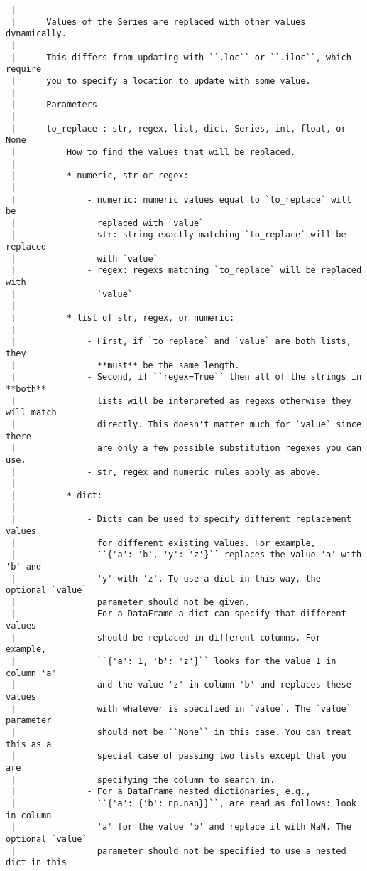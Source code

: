 \documentclass[
  letterpaper,
  DIV=11,
  numbers=noendperiod]{scrreprt}
\begin{document}
\begin{verbatim}
 |      
 |      Values of the Series are replaced with other values dynamically.
 |      
 |      This differs from updating with ``.loc`` or ``.iloc``, which require
 |      you to specify a location to update with some value.
 |      
 |      Parameters
 |      ----------
 |      to_replace : str, regex, list, dict, Series, int, float, or None
 |          How to find the values that will be replaced.
 |      
 |          * numeric, str or regex:
 |      
 |              - numeric: numeric values equal to `to_replace` will be
 |                replaced with `value`
 |              - str: string exactly matching `to_replace` will be replaced
 |                with `value`
 |              - regex: regexs matching `to_replace` will be replaced with
 |                `value`
 |      
 |          * list of str, regex, or numeric:
 |      
 |              - First, if `to_replace` and `value` are both lists, they
 |                **must** be the same length.
 |              - Second, if ``regex=True`` then all of the strings in **both**
 |                lists will be interpreted as regexs otherwise they will match
 |                directly. This doesn't matter much for `value` since there
 |                are only a few possible substitution regexes you can use.
 |              - str, regex and numeric rules apply as above.
 |      
 |          * dict:
 |      
 |              - Dicts can be used to specify different replacement values
 |                for different existing values. For example,
 |                ``{'a': 'b', 'y': 'z'}`` replaces the value 'a' with 'b' and
 |                'y' with 'z'. To use a dict in this way, the optional `value`
 |                parameter should not be given.
 |              - For a DataFrame a dict can specify that different values
 |                should be replaced in different columns. For example,
 |                ``{'a': 1, 'b': 'z'}`` looks for the value 1 in column 'a'
 |                and the value 'z' in column 'b' and replaces these values
 |                with whatever is specified in `value`. The `value` parameter
 |                should not be ``None`` in this case. You can treat this as a
 |                special case of passing two lists except that you are
 |                specifying the column to search in.
 |              - For a DataFrame nested dictionaries, e.g.,
 |                ``{'a': {'b': np.nan}}``, are read as follows: look in column
 |                'a' for the value 'b' and replace it with NaN. The optional `value`
 |                parameter should not be specified to use a nested dict in this

\end{verbatim}
\end{document}

